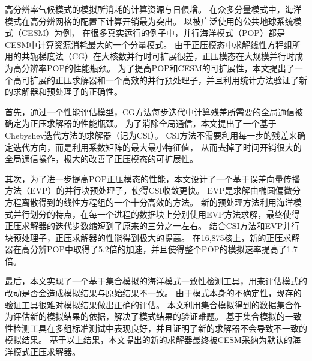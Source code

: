 \begin{cabstract}
  高分辨率气候模式的模拟所消耗的计算资源与日俱增。
  在众多分量模式中，海洋模式在高分辨网格的配置下计算开销最为突出。
  以被广泛使用的公共地球系统模式（CESM）为例， 在很多真实运行的例子中，并行海洋模式（POP）都是CESM中计算资源消耗最大的一个分量模式。 
  由于正压模态中求解线性方程组所用的共轭梯度法（CG）在大核数并行时可扩展很差，正压模态在大规模并行时成为高分辨率POP的性能瓶颈。
  为了提高POP和CESM的可扩展性，本文提出了一个高可扩展的正压求解器和一个高效的并行预处理子，并且利用统计方法验证了新的求解器和预处理子的正确性。

  首先，通过一个性能评估模型，CG方法每步迭代中计算残差所需要的全局通信被确定为正压求解器的性能瓶颈。 
  为了消除全局通信，本文提出了一个基于Chebyshev迭代方法的求解器（记为CSI）。
  CSI方法不需要利用每一步的残差来确定迭代方向，而是利用系数矩阵的最大最小特征值，
  从而去掉了时间开销很大的全局通信操作，极大的改善了正压模态的可扩展性。

  其次，为了进一步提高POP正压模态的性能，本文设计了一个基于误差向量传播方法（EVP）的并行块预处理子，使得CSI收敛更快。 
  EVP是求解由椭圆偏微分方程离散得到的线性方程组的一个十分高效的方法。
  新的预处理方法利用海洋模式并行划分的特点，在每一个进程的数据块上分别使用EVP方法求解，最终使得正压求解器的迭代步数缩短到了原来的三分之一左右。 
  结合CSI方法和EVP并行块预处理子，正压求解器的性能得到极大的提高。 在16,875核上，新的正压求解器在高分辨POP中取得了5.2倍的加速，并且使得整个POP的模拟速率提高了1.7倍。 
  

  最后，本文实现了一个基于集合模拟的海洋模式一致性检测工具，用来评估模式的改动是否会造成模拟结果与原始结果不一致。
  由于模式本身的不确定性，现存的验证工具很难对模拟结果做出正确的评估。
  本文利用集合模拟得到的数据集合作为评估新的模拟结果的依据，解决了模式结果的验证难题。   
  基于集合模拟的一致性检测工具在多组标准测试中表现良好，并且证明了新的求解器不会导致不一致的模拟结果。
  基于以上结果，本文提出的新的求解器最终被CESM采纳为默认的海洋模式正压求解器。

\end{cabstract}


